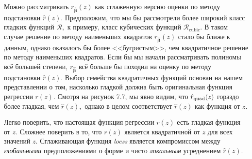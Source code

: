 Можно рассматривать $r_{\hat{\bm \beta}}(z)$ как сглаженную версию оценки по методу подстановки $\hat r(z)$. Предположим, что мы бы рассмотрели более широкий класс гладких функций $\mathcal R,$ к примеру, класс кубических функций $\mathcal R_\text{cubic}.$ В таком случае решение по методу наименьших квадратов $r_{{\hat{\bm\beta}}}(z)$ стало бы ближе к данным, однако оказалось бы более <<бугристым>>, чем квадратичное решение по методу наименьших квадратов. Если бы мы начали рассматривать полиномы всё большей степени, $r_{\hat{\bm \beta}}$ всё больше бы походил на оценку по методу подстановки $\hat r  (z)$. Выбор семейства квадратичных функций основан на нашем представлении о том, насколько гладкой должна быть оригинальная функция регрессии $r(z)$.
 Смотря на рисунок 7.7, мы явно видим, что $\hat{r}_{\text{quad}}(z)$ гораздо более гладкая, чем $\hat r (z),$ однако в целом соответствует $\hat r (z)$ как функция от $z$.
 
Легко поверить, что настоящая функция регрессии $r(z)$ есть гладкая функция от $z$.  Сложнее поверить в то, что $r(z)$ является квадратичной от $z$ для всех значений $z$. Сглаживающая функция \textit{loess} является компромиссом между \textit{глобальными} предположениями о форме и чисто \textit{локальным} усреднением $\hat r(z)$.  


